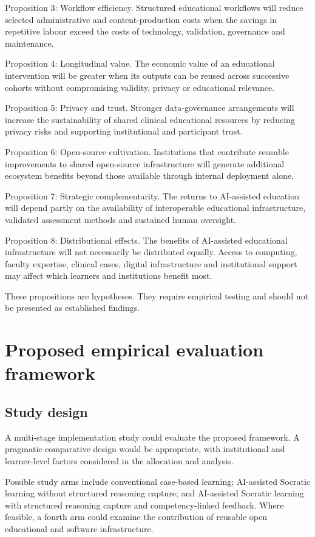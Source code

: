 \documentclass[11pt,a4paper]{article}
\begin{document}
Proposition 3: Workflow efficiency. Structured educational workflows will reduce selected administrative and content-production costs when the savings in repetitive labour exceed the costs of technology, validation, governance and maintenance.

Proposition 4: Longitudinal value. The economic value of an educational intervention will be greater when its outputs can be reused across successive cohorts without compromising validity, privacy or educational relevance.

Proposition 5: Privacy and trust. Stronger data-governance arrangements will increase the sustainability of shared clinical educational resources by reducing privacy risks and supporting institutional and participant trust.

Proposition 6: Open-source cultivation. Institutions that contribute reusable improvements to shared open-source infrastructure will generate additional ecosystem benefits beyond those available through internal deployment alone.

Proposition 7: Strategic complementarity. The returns to AI-assisted education will depend partly on the availability of interoperable educational infrastructure, validated assessment methods and sustained human oversight.

Proposition 8: Distributional effects. The benefits of AI-assisted educational infrastructure will not necessarily be distributed equally. Access to computing, faculty expertise, clinical cases, digital infrastructure and institutional support may affect which learners and institutions benefit most.

These propositions are hypotheses. They require empirical testing and should not be presented as established findings.

\section{Proposed empirical evaluation framework}
\subsection{Study design}
A multi-stage implementation study could evaluate the proposed framework. A pragmatic comparative design would be appropriate, with institutional and learner-level factors considered in the allocation and analysis.

Possible study arms include conventional case-based learning; AI-assisted Socratic learning without structured reasoning capture; and AI-assisted Socratic learning with structured reasoning capture and competency-linked feedback. Where feasible, a fourth arm could examine the contribution of reusable open educational and software infrastructure.
\end{document}
